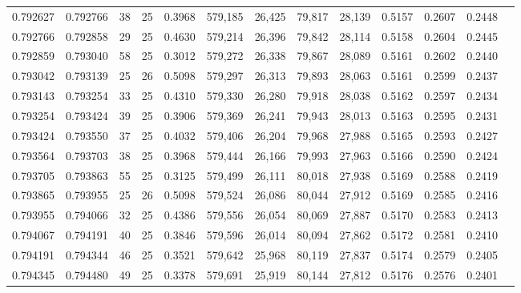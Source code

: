 \begin{tabular}{rrrrrrrrrrrrr}
0.792627 & 0.792766 &    38 &  25 &                                     0.3968 & 579,185 &  26,425 &  79,817 &  28,139 & 0.5157 & 0.2607 & 0.2448 \\
0.792766 & 0.792858 &    29 &  25 &                                     0.4630 & 579,214 &  26,396 &  79,842 &  28,114 & 0.5158 & 0.2604 & 0.2445 \\
0.792859 & 0.793040 &    58 &  25 &                                     0.3012 & 579,272 &  26,338 &  79,867 &  28,089 & 0.5161 & 0.2602 & 0.2440 \\
0.793042 & 0.793139 &    25 &  26 &                                     0.5098 & 579,297 &  26,313 &  79,893 &  28,063 & 0.5161 & 0.2599 & 0.2437 \\
0.793143 & 0.793254 &    33 &  25 &                                     0.4310 & 579,330 &  26,280 &  79,918 &  28,038 & 0.5162 & 0.2597 & 0.2434 \\
0.793254 & 0.793424 &    39 &  25 &                                     0.3906 & 579,369 &  26,241 &  79,943 &  28,013 & 0.5163 & 0.2595 & 0.2431 \\
0.793424 & 0.793550 &    37 &  25 &                                     0.4032 & 579,406 &  26,204 &  79,968 &  27,988 & 0.5165 & 0.2593 & 0.2427 \\
0.793564 & 0.793703 &    38 &  25 &                                     0.3968 & 579,444 &  26,166 &  79,993 &  27,963 & 0.5166 & 0.2590 & 0.2424 \\
0.793705 & 0.793863 &    55 &  25 &                                     0.3125 & 579,499 &  26,111 &  80,018 &  27,938 & 0.5169 & 0.2588 & 0.2419 \\
0.793865 & 0.793955 &    25 &  26 &                                     0.5098 & 579,524 &  26,086 &  80,044 &  27,912 & 0.5169 & 0.2585 & 0.2416 \\
0.793955 & 0.794066 &    32 &  25 &                                     0.4386 & 579,556 &  26,054 &  80,069 &  27,887 & 0.5170 & 0.2583 & 0.2413 \\
0.794067 & 0.794191 &    40 &  25 &                                     0.3846 & 579,596 &  26,014 &  80,094 &  27,862 & 0.5172 & 0.2581 & 0.2410 \\
0.794191 & 0.794344 &    46 &  25 &                                     0.3521 & 579,642 &  25,968 &  80,119 &  27,837 & 0.5174 & 0.2579 & 0.2405 \\
0.794345 & 0.794480 &    49 &  25 &                                     0.3378 & 579,691 &  25,919 &  80,144 &  27,812 & 0.5176 & 0.2576 & 0.2401 \\

\end{tabular}
